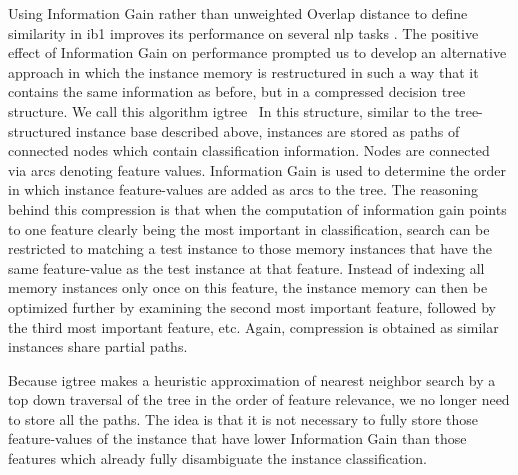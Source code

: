 \documentclass{report}
\begin{document}
Using Information Gain rather than unweighted Overlap distance to
define similarity in {\sc ib1} improves its performance on several
{\sc nlp} tasks \cite{Daelemans+92b,VandenBosch+93,VandenBosch97}.
The positive effect of Information Gain on performance prompted us to
develop an alternative approach in which the instance memory is
restructured in such a way that it contains the same information as
before, but in a compressed decision tree structure. We call this
algorithm {\sc igtree}~\cite{Daelemans+97} 
In this structure, similar to the
tree-structured instance base described above, instances are stored as
paths of connected nodes which contain classification
information. Nodes are connected via arcs denoting feature
values. Information Gain is used to determine the order in which
instance feature-values are added as arcs to the tree. The reasoning
behind this compression is that when the computation of information
gain points to one feature clearly being the most important in
classification, search can be restricted to matching a test instance
to those memory instances that have the same feature-value as the test
instance at that feature. Instead of indexing all memory instances
only once on this feature, the instance memory can then be optimized
further by examining the second most important feature, followed by
the third most important feature, etc.  Again, compression is obtained
as similar instances share partial paths.


Because {\sc igtree} makes a heuristic approximation of nearest
neighbor search by a top down traversal of the tree in the order of
feature relevance, we no longer need to store all the paths. The idea
is that it is not necessary to fully store those feature-values of the
instance that have lower Information Gain than those features which
already fully disambiguate the instance classification.
\end{document}
